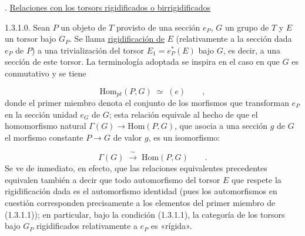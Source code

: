 \par\medskip{}.  \underline{Relaciones con los torsors rigidificados o
birrigidificados}

1.3.1.0.  Sean $P$ un objeto de $T$ provisto de una sección $e_P$,
$G$ un grupo de \underline{$T$} y $E$ un torsor bajo $G_P$. Se llama
\underline{rigidificación de} $E$ (relativamente a la sección dada
$e_P$ de $P$) a una trivialización del torsor
$E_1 = e_P^*(E)$ bajo $G$,
es decir, a una sección de este torsor. La terminología adoptada se
inspira en el caso en que $G$ es conmutativo y se tiene

\begin{equation}\tag{1.3.1.1}
\mathrm{Hom}_{pt}(P,G) \;\simeq\; (e) \qquad ,
\end{equation}
donde el primer miembro denota el conjunto de los morfismos que
transforman $e_P$ en la sección unidad $e_G$ de $G$; esta relación
equivale al hecho de que el homomorfismo natural
$\Gamma(G) \longrightarrow \mathrm{Hom}(P,G)$, que asocia a una
sección $g$ de $G$ el morfismo constante $P \longrightarrow G$ de
valor $g$, es un isomorfismo:

\begin{equation}\tag{1.3.1.2}
\Gamma(G) \;\xrightarrow{\;\sim\;}\; \mathrm{Hom}(P,G) \qquad .
\end{equation}
Se ve de inmediato, en efecto, que las relaciones equivalentes
precedentes equivalen también a decir que todo automorfismo del torsor
$E$ que respete la rigidificación dada es el automorfismo identidad
(pues los automorfismos en cuestión corresponden precisamente a los
elementos del primer miembro de (1.3.1.1)); en particular, bajo la
condición (1.3.1.1), la categoría de los torsors bajo $G_P$
rigidificados relativamente a $e_P$ es «rígida».

